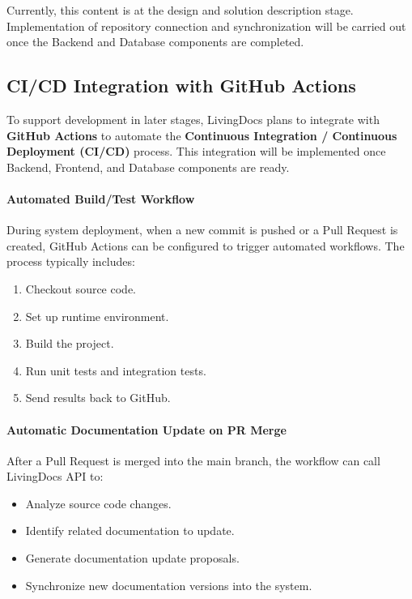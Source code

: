 Currently, this content is at the design and solution description stage. Implementation of repository connection and synchronization will be carried out once the Backend and Database components are completed.

\subsection{CI/CD Integration with GitHub Actions}

To support development in later stages, LivingDocs plans to integrate with \textbf{GitHub Actions} to automate the \textbf{Continuous Integration / Continuous Deployment (CI/CD)} process. This integration will be implemented once Backend, Frontend, and Database components are ready.

\paragraph{Automated Build/Test Workflow}

During system deployment, when a new commit is pushed or a Pull Request is created, GitHub Actions can be configured to trigger automated workflows. The process typically includes:

\begin{enumerate}
    \item Checkout source code.
    \item Set up runtime environment.
    \item Build the project.
    \item Run unit tests and integration tests.
    \item Send results back to GitHub.
\end{enumerate}

\paragraph{Automatic Documentation Update on PR Merge}

After a Pull Request is merged into the main branch, the workflow can call LivingDocs API to:

\begin{itemize}
    \item Analyze source code changes.
    \item Identify related documentation to update.
    \item Generate documentation update proposals.
    \item Synchronize new documentation versions into the system.
\end{itemize}

